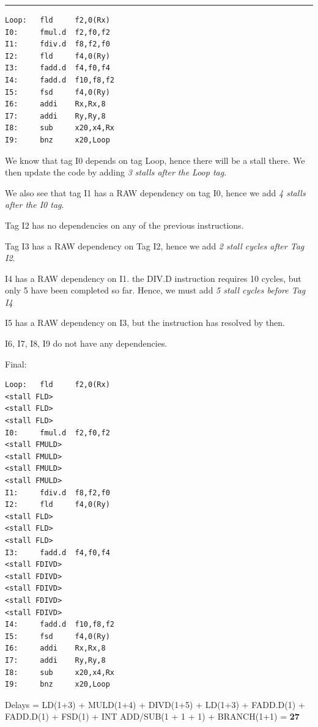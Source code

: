\documentclass[11pt]{exam}
\newcounter{questionCounter}
\newcounter{partCounter}[questionCounter]
\newenvironment{namedquestion}[1]{%
    \addtocounter{questionCounter}{1}%
    \setcounter{partCounter}{0}%
    \vspace{.2in}%
        \noindent{\bf #1}%
    \vspace{0.3em} \hrule \vspace{.1in}%
}{}
\begin{document}
\begin{namedquestion}{Problem 3.2}

\begin{lstlisting}
Loop:   fld     f2,0(Rx) 
I0:     fmul.d  f2,f0,f2 
I1:     fdiv.d  f8,f2,f0 
I2:     fld     f4,0(Ry) 
I3:     fadd.d  f4,f0,f4 
I4:     fadd.d  f10,f8,f2 
I5:     fsd     f4,0(Ry) 
I6:     addi    Rx,Rx,8 
I7:     addi    Ry,Ry,8 
I8:     sub     x20,x4,Rx 
I9:     bnz     x20,Loop 
\end{lstlisting}

We know that tag I0 depends on tag Loop, hence there will be a stall there. We then update the code by adding \textit{3 stalls after the Loop tag}. 

We also see that tag I1 has a RAW dependency on tag I0, hence we add \textit{4 stalls after the I0 tag}. 

Tag I2 has no dependencies on any of the previous instructions. 

Tag I3 has a RAW dependency on Tag I2, hence we add \textit{2 stall cycles after Tag I2}. 

I4 has a RAW dependency on I1. the DIV.D instruction requires 10 cycles, but only 5 have been completed so far. Hence, we must add \textit{5 stall cycles before Tag I4}

I5 has a RAW dependency on I3, but the instruction has resolved by then. 

I6, I7, I8, I9 do not have any dependencies. 

\newpage

Final:

\begin{lstlisting}
Loop:   fld     f2,0(Rx) 
<stall FLD>
<stall FLD>
<stall FLD> 
I0:     fmul.d  f2,f0,f2 
<stall FMULD>
<stall FMULD>
<stall FMULD>
<stall FMULD>
I1:     fdiv.d  f8,f2,f0 
I2:     fld     f4,0(Ry) 
<stall FLD>
<stall FLD>
<stall FLD>
I3:     fadd.d  f4,f0,f4 
<stall FDIVD>
<stall FDIVD>
<stall FDIVD>
<stall FDIVD>
<stall FDIVD>
I4:     fadd.d  f10,f8,f2 
I5:     fsd     f4,0(Ry) 
I6:     addi    Rx,Rx,8 
I7:     addi    Ry,Ry,8 
I8:     sub     x20,x4,Rx 
I9:     bnz     x20,Loop 
\end{lstlisting}

Delays = 
LD(1+3) + MULD(1+4) + DIVD(1+5) + LD(1+3) + FADD.D(1) + FADD.D(1) + FSD(1) + INT ADD/SUB(1 + 1 + 1) + BRANCH(1+1) = \textbf{27}\\ 

\end{namedquestion}
\end{document}
